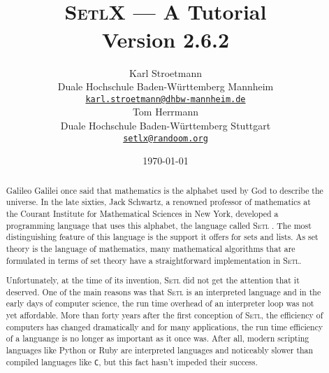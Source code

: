 \documentclass[twoside]{report}
\title{\vspace*{-1cm}
  \epsfig{file=aleph0.eps,scale=0.21} \\[0.5cm]
\textsc{SetlX} --- A Tutorial \\[0.5cm]
Version 2.6.2
}
\author{Karl Stroetmann \\[0.2cm]
Duale Hochschule Baden-W\"urttemberg Mannheim \\[0.2cm]
\href{mailto:karl.stroetmann@dhbw-mannheim.de}{\texttt{karl.stroetmann@dhbw-mannheim.de}} \\[0.5cm]
 Tom Herrmann  \\[0.2cm]
Duale Hochschule Baden-W\"urttemberg Stuttgart \\[0.2cm]
\href{mailto:setlx@randoom.org}{\texttt{setlx@randoom.org}}
}
\date{\today}
\begin{document}
\maketitle

\begin{abstract}
Galileo Galilei once said that mathematics is the alphabet used by God to describe the universe.
In the late sixties, Jack Schwartz, a renowned professor of mathematics at the Courant Institute for
Mathematical Sciences in New York, developed a programming language that uses this alphabet, the
language called \textsc{Setl} \cite{schwartz:1970, setl86}.  The most distinguishing feature of this language is the
support it offers for sets and lists.   As set theory is the language of mathematics, many mathematical
algorithms that are formulated in terms of set theory have a straightforward implementation in
\textsc{Setl}. 

Unfortunately, at the time of its invention, \textsc{Setl} did not get the attention that it deserved.
One of the main reasons was that \textsc{Setl} is an interpreted language and in the early days of
computer science, the run time overhead of an interpreter loop was not yet affordable.  More than
forty years after the first conception of \textsc{Setl}, the efficiency of computers has changed
dramatically and for many applications, the run time efficiency of a languange is no
longer as important as it once was.  After all, 
modern scripting languages like Python \cite{vanRossum:95} or Ruby \cite{flanagan:2008}
are interpreted languages and noticeably slower than compiled languages like \texttt{C}, but this
fact hasn't impeded their success. 


\end{abstract}
\end{document}
